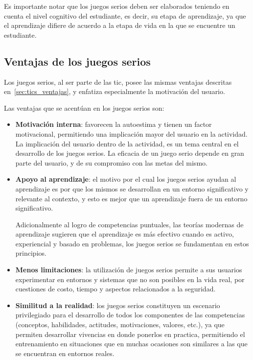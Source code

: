 Es importante notar que los juegos serios deben ser elaborados teniendo en cuenta el
nivel cognitivo del estudiante, es decir, su etapa de aprendizaje, ya que el
aprendizaje difiere de acuerdo a la etapa de vida en la que se encuentre un
estudiante\cite{education:games}.

\subsection{Ventajas de los juegos serios}

Los juegos serios, al ser parte de las \Gls{tic}, posee las
mismas ventajas descritas en~\ref{sec:tics_ventajas}, y enfatiza especialmente
la motivación del usuario.

Las ventajas que se acentúan en los juegos serios son:

\begin{itemize}

\item \textbf{Motivación interna}: favorecen la autoestima y tienen un factor
    motivacional\cite{guenaga2013serious}, permitiendo una implicación mayor del
    usuario en la actividad\cite{sg:aoverview}. La implicación del usuario
    dentro de la actividad, es un tema central en el desarrollo de los juegos
    serios\cite{charsky:2010}. La eficacia de un juego serio depende en gran parte del usuario, y de su
    compromiso con las metas del mismo\cite{sg:aoverview}.

\item \textbf{Apoyo al aprendizaje}: el motivo por el cual los juegos serios
    ayudan al aprendizaje es por que los mismos se desarrollan en un entorno
    significativo y relevante al contexto, y esto es mejor que un aprendizaje
    fuera de un entorno significativo\cite{sg:aoverview}.
    
   Adicionalmente al logro de competencias puntuales, las teorías modernas de
   aprendizaje sugieren que el aprendizaje es más efectivo cuando es activo,
   experiencial y basado en problemas, los juegos serios se fundamentan en estos
   principios\cite{guenaga2013serious}.

\item \textbf{Menos limitaciones}: la utilización de juegos serios permite a sus usuarios
    experimentar en entornos y sistemas que no son posibles en la vida real, por
    cuestiones de costo, tiempo y aspectos relacionados a la
    seguridad\cite{sg:aoverview}.

\item \textbf{Similitud a la realidad}: los juegos serios constituyen un
    escenario privilegiado para el desarrollo de todos los componentes de las
    competencias (conceptos, habilidades, actitudes, motivaciones, valores,
    etc.), ya que permiten desarrollar vivencias en donde ponerlos en practica,
    permitiendo el entrenamiento en situaciones que en muchas ocasiones son
    similares a las que se encuentran en entornos
    reales\cite{guenaga2013serious,sg:aoverview}.
    

\end{itemize}
